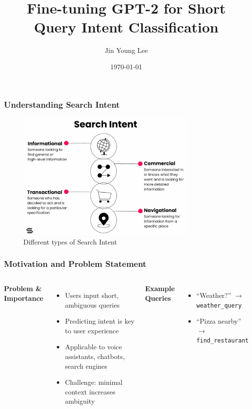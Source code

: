 \documentclass{beamer}
\title{Fine-tuning GPT-2 for Short Query Intent Classification}
\author{Jin Young Lee}
\date{\today}
\begin{document}
\begin{frame}
\titlepage
\end{frame}

\begin{frame}
\frametitle{Understanding Search Intent}
\centering
\begin{figure}
    \includegraphics[width=0.8\textwidth]{assets/search_intent.png}
    \caption{Different types of Search Intent}
\end{figure}
\end{frame}

\begin{frame}
\frametitle{Motivation and Problem Statement}
\begin{columns}
  \textbf{Problem \& Importance}
  \begin{itemize}
    \item Users input short, ambiguous queries
    \item Predicting intent is key to user experience
    \item Applicable to voice assistants, chatbots, search engines
    \item Challenge: minimal context increases ambiguity
  \end{itemize}

  \textbf{Example Queries}
  \begin{itemize}
    \item ``Weather?'' $\rightarrow$ \texttt{weather\_query}
    \item ``Pizza nearby'' $\rightarrow$ \texttt{find\_restaurant}
  \end{itemize}
\end{columns}
\end{frame}
\end{document}

